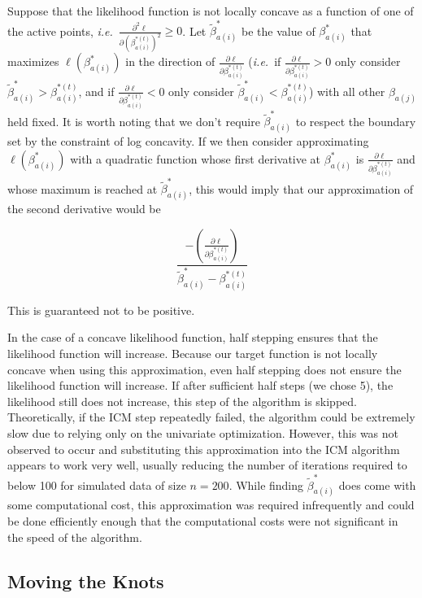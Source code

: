 	Suppose that the likelihood function is not locally concave as a function of one of the active points, \emph{i.e.}\ $ \frac{\partial^2 \ell} { \partial {(\beta^{*(t)}_{a(i)})}^2} \geq 0$. Let $\tilde \beta^*_{a(i)}$ be the value of $\beta^*_{a(i)}$ that maximizes $\ell(\beta^*_{a(i)})$ in the direction of $ \frac{\partial \ell} {\partial \beta^{*(t)}_{a(i)}} $ (\emph{i.e.}\ if $  \frac{\partial \ell} {\partial \beta^{*(t)}_{a(i)}} > 0$ only consider  $\tilde \beta^*_{a(i)} > \beta^{*(t)}_{a(i)}$, and if $  \frac{\partial \ell} {\partial \beta^{*(t)}_{a(i)}}< 0 $ only consider $\tilde \beta^*_{a(i)} < \beta^{*(t)}_{a(i)}$)  with all other $\beta_{a(j)}$ held fixed. It is worth noting that we don't require $\tilde \beta^*_{a(i)}$ to respect the boundary set by the constraint of log concavity. If we then consider approximating $\ell(\beta^*_{a(i)})$ with a quadratic function whose first derivative at $\beta^*_{a(i)}$ is $  \frac{\partial \ell} {\partial \beta^{*(t)}_{a(i)}} $ and whose maximum is reached at $\tilde \beta^*_{a(i)}$, this would imply that our approximation of the second derivative would be
	
	 \[\frac{- \left( \frac{\partial \ell} {\partial \beta^{*(t)}_{a(i)} }  \right) } {\tilde \beta^*_{a(i)} -\beta^{*(t)}_{a(i)}}
	 \]
	 
	 This is guaranteed not to be positive.
	
	In the case of a concave likelihood function, half stepping ensures that the likelihood function will increase. Because our target function is not locally concave when using this approximation, even half stepping does not ensure the likelihood function will increase. If after sufficient half steps (we chose 5), the likelihood still does not increase, this step of the algorithm is skipped. Theoretically, if the ICM step repeatedly failed, the algorithm could be extremely slow due to relying only on the univariate optimization. However, this was not observed to occur and substituting this approximation into the ICM algorithm appears to work very well, usually reducing the number of iterations required to below 100 for simulated data of size $n = 200$. While finding  $\tilde \beta^*_{a(i)}$ does come with some computational cost, this approximation was required infrequently and could be done efficiently enough that the computational costs were not significant in the speed of the algorithm. 
	
		{\subsection{Moving the Knots} } 
	
